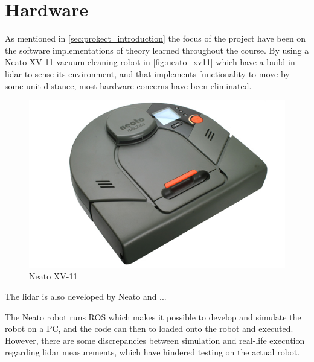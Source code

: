 
\section{Hardware} %
\label{sec:hardware}

As mentioned in \autoref{sec:prokect_introduction} the focus of the project have been on the software implementations of theory learned throughout the course. By using a Neato XV-11 vacuum cleaning robot in \autoref{fig:neato_xv11} which have a build-in lidar to sense its environment, and that implements functionality to move by some unit distance, most hardware concerns have been eliminated.\\

\begin{figure}[H]
\centering
\includegraphics[scale=0.40]{images/neato_xv11}
\caption{Neato XV-11}
\label{fig:neato_xv11}
\end{figure}

The lidar is also developed by Neato and ...\\

The Neato robot runs ROS which makes it possible to develop and simulate the robot on a PC, and the code can then to loaded onto the robot and executed.\\
However, there are some discrepancies between simulation and real-life execution regarding lidar measurements, which have hindered testing on the actual robot.

